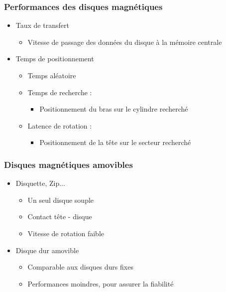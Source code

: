 \begin{frame}
\frametitle{Performances des disques magnétiques}
\begin{itemize}
\item Taux de transfert
\begin{itemize}
\item Vitesse de passage des données du disque à la mémoire centrale
\end{itemize}
\item Temps de positionnement
\begin{itemize}
\item Temps aléatoire
\item Temps de recherche : 
\begin{itemize}
\item Positionnement du bras sur le cylindre recherché
\end{itemize}
\item Latence de rotation :
\begin{itemize}
\item Positionnement de la tête sur le secteur recherché
\end{itemize}
\end{itemize}
\end{itemize}
\end{frame}

\begin{frame}
\frametitle{Disques magnétiques amovibles}
\begin{itemize}
\item Disquette, Zip...
\begin{itemize}
\item Un seul disque souple
\item Contact tête - disque
\item Vitesse de rotation faible
\end{itemize}
\item Disque dur amovible
\begin{itemize}
\item Comparable aux disques durs fixes
\item Performances moindres, pour assurer la fiabilité
\end{itemize}
\end{itemize}
\end{frame}


